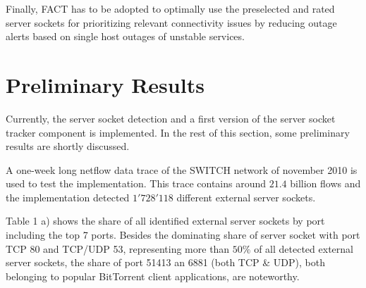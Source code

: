 \documentclass{sigcomm-alternate}
\begin{document}
Finally, FACT has to be adopted to optimally use the preselected and rated 
server sockets for prioritizing relevant connectivity issues by reducing 
outage alerts based on single host outages of unstable services.

\section{Preliminary Results} 
Currently, the server socket detection and a first version of the 
server socket tracker component is implemented. In the 
rest of this section, some preliminary results are shortly discussed. 

A one-week long netflow data trace of the SWITCH network of november 2010 is used to test the
implementation. This trace contains around $21.4$ billion flows and
the implementation detected $1'728'118$ different external server sockets.

Table 1 a) shows the share of all identified external server sockets by port including the top 7 ports. Besides the dominating share
of server socket with port TCP 80 and TCP/UDP 53, representing more than $50\%$ of all detected external server sockets,
the share of port 51413 an 6881 (both TCP \& UDP), both belonging to popular BitTorrent client applications, are noteworthy. 
\end{document}
